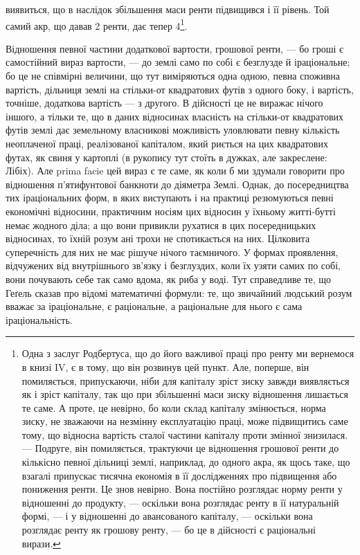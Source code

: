 \parcont{}  %
виявиться, що в наслідок збільшення маси ренти підвищився і її рівень. Той
самий акр, що давав 2 ренти, дає тепер 4\footnote{
Одна з заслуг Родбертуса, що до його важливої праці про ренту ми вернемося в книзі IV,
є в тому, що він розвинув цей пункт. Але, поперше, він помиляється, припускаючи, ніби для капіталу
зріст зиску завжди виявляється як і зріст капіталу, так що при збільшенні маси зиску відношення
лишається
те саме. А проте, це невірно, бо коли склад капіталу змінюється, норма зиску, не зважаючи на
незмінну експлуатацію праці, може підвищитись саме тому, що відносна вартість сталої частини
капіталу
проти змінної знизилася. — Подруге, він помиляється, трактуючи це відношення грошової ренти до
кількісно певної дільниці землі, наприклад, до одного акра, як щось таке, що взагалі припускає
тисячна
економія в її дослідженнях про підвищення або пониження ренти. Це знов невірно. Вона постійно
розглядає норму ренти у відношенні до продукту, — оскільки вона розглядає ренту в її натуральній
формі, — і у відношенні до авансованого капіталу, — оскільки вона розглядає ренту як грошову ренту,
—
бо це в дійсності є раціональні вирази.
}.

Відношення певної частини додаткової вартости, грошової ренти, — бо гроші
є самостійний вираз вартости, — до землі само по собі є безглузде й іраціональне;
бо це не співмірні величини, що тут виміряються одна одною, певна
споживна вартість, дільниця землі на стільки-от квадратових футів з одного
боку, і вартість, точніше, додаткова вартість — з другого. В дійсності це не виражає
нічого іншого, а тільки те, що в даних відносинах власність на стільки-от квадратових
футів землі дає земельному власникові можливість уловлювати певну кількість
неоплаченої праці, реалізованої капіталом, який риється на цих квадратових футах,
як свиня у картоплі (в рукопису тут стоїть в дужках, але закреслене: Лібіх). Але
prima facie цей вираз є те саме, як коли б ми здумали говорити про відношення
п’ятифунтової банкноти до діяметра Землі. Однак, до посередництва тих іраціональних
форм, в яких виступають і на практиці резюмуються певні економічні
відносини, практичним носіям цих відносин у їхньому житті-бутті немає
жодного діла; а що вони привикли рухатися в цих посередницьких відносинах,
то їхній розум ані трохи не спотикається на них. Цілковита суперечність для них
не має рішуче нічого таємничого. У формах проявлення, відчужених від внутрішнього
зв’язку і безглуздих, коли їх узяти самих по собі, вони почувають себе
так само вдома, як риба у воді. Тут справедливе те, що Геґель сказав про
відомі математичні формули: те, що звичайний людський розум вважає за
іраціональне, є раціональне, а раціональне для нього є сама іраціональність.

